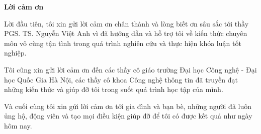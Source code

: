 \begin{center}
\textbf{\large{Lời cảm ơn}	}
\end{center}

Lời đầu tiên, tôi xin gửi lời cảm ơn chân thành và lòng biết ơn sâu sắc tới
thầy PGS. TS. Nguyễn Việt Anh vì đã hướng dẫn và hỗ trợ tôi về kiến thức chuyên môn vô cùng tận tình trong quá trình nghiên cứu
và thực hiện khóa luận tốt nghiệp.

Tôi cũng xin gửi lời cảm ơn đến các thầy cô giáo trường Đại học Công nghệ - Đại học Quốc Gia Hà Nội, các thầy cô khoa Công nghệ thông tin đã truyền đạt những kiến thức và giúp đỡ tôi trong suốt quá trình học tập của mình.

Và cuối cùng tôi xin gửi lời cảm ơn tới gia đình và bạn bè, những người đã luôn ủng hộ, động viên và tạo mọi điều kiện giúp đỡ để tôi có được kết quả như ngày hôm nay. 